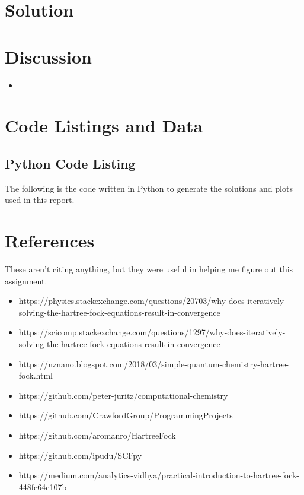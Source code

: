 \documentclass[10pt, oneside, letterpaper]{article}
\begin{document}
\section{Solution}


\section{Discussion}

\begin{itemize}
    \item 
\end{itemize}

\newpage
\section{Code Listings and Data}

\subsection{Python Code Listing}
\label{code-listing-python}
The following is the code written in Python to generate the solutions and plots used in this report.


\newpage
\section{References}

These aren't citing anything, but they were useful in helping me figure out this assignment.

\begin{itemize}
  \item https://physics.stackexchange.com/questions/20703/why-does-iteratively-solving-the-hartree-fock-equations-result-in-convergence
  \item https://scicomp.stackexchange.com/questions/1297/why-does-iteratively-solving-the-hartree-fock-equations-result-in-convergence
  \item https://nznano.blogspot.com/2018/03/simple-quantum-chemistry-hartree-fock.html
  \item https://github.com/peter-juritz/computational-chemistry
  \item https://github.com/CrawfordGroup/ProgrammingProjects
  \item https://github.com/aromanro/HartreeFock
  \item https://github.com/ipudu/SCFpy
  \item https://medium.com/analytics-vidhya/practical-introduction-to-hartree-fock-448fc64c107b
\end{itemize}
\end{document}
